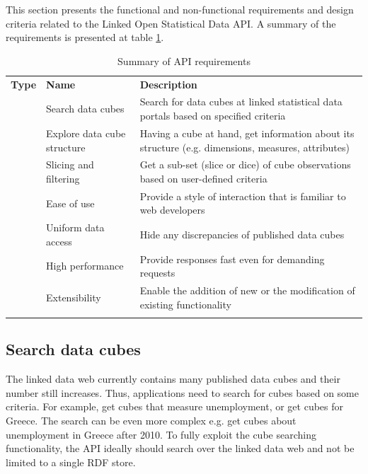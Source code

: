 \documentclass{llncs}
\begin{document}
This section presents the functional and non-functional requirements and design criteria related to the Linked Open Statistical Data API.
A summary of the requirements is presented at table \ref{tbl:req}.

\begin{table}
\caption{Summary of API requirements}
\begin{tabular}{p{2cm}p{4cm}p{5.9cm}}
\hline\noalign{\smallskip}
\textbf{Type} & \textbf{Name} & \textbf{Description}\\
\noalign{\smallskip}
\hline
\noalign{\smallskip}
\multirow{3}{*}{functional} & Search data cubes & Search for data cubes at linked statistical data portals based on specified criteria\\\noalign{\smallskip}
 & Explore data cube structure & Having a cube at hand, get information about its structure (e.g. dimensions, measures, attributes)\\\noalign{\smallskip}
 & Slicing and filtering & Get a sub-set (slice or dice) of cube observations based on user-defined criteria\\\noalign{\smallskip}\hline
\multirow{4}{*}{non-functional} & Ease of use & Provide a style of interaction that is familiar to web developers\\\noalign{\smallskip}
 & Uniform data access & Hide any discrepancies of published data cubes\\\noalign{\smallskip}
 & High performance & Provide responses fast even for demanding requests\\\noalign{\smallskip}
 & Extensibility & Enable the addition of new or the modification of existing functionality\\\noalign{\smallskip}
\hline
\end{tabular}
\label{tbl:req}
\end{table}

\subsection{Search data cubes}\label{sec:search}

The linked data web currently contains many published data cubes and their number still increases. Thus, applications need to search for cubes based on some criteria. For example, get cubes that measure unemployment, or get cubes for Greece. The search can be even more complex e.g. get cubes about unemployment in Greece after 2010. To fully exploit the cube searching functionality, the API ideally should search over the linked data web and not be limited to a single RDF store.
\end{document}
